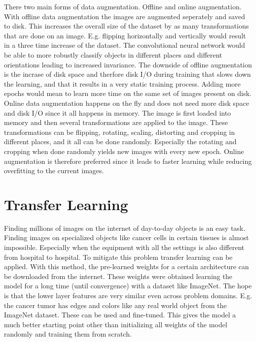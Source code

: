 There two main forms of data augmentation. Offline and online augmentation. With offline data augmentation the images are augmented seperately and saved to disk. This increases the overall size of the dataset by as many transformations that are done on an image. E.g. flipping horizontally and vertically would result in a three time increase of the dataset. The convolutional neural network would be able to more robustly classify objects in different places and different orientations leading to increased invariance. The downside of offline augmentation is the incrase of disk space and therfore disk I/O during training that slows down the learning, and that it results in a very static training process. Adding more epochs would mean to learn more time on the same set of images present on disk.
Online data augmentation happens on the fly and does not need more disk space and disk I/O since it all happens in memory. The image is first loaded into memory and then several transformations are applied to the image. These transformations can be flipping, rotating, scaling, distorting and cropping in different places, and it all can be done randomly. Especially the rotating and cropping when done randomly yields new images with every new epoch. Online augmentation is therefore preferred since it leads to faster learning while reducing overfitting to the current images.

\section{Transfer Learning}

Finding millions of images on the internet of day-to-day objects is an easy task. Finding images on specialized objects like cancer cells in certain tissues is almost impossible. Especially when the equipment with all the settings is also different from hospital to hospital. To mitigate this problem transfer learning can be applied. With this method, the pre-learned weights for a certain architecture can be downloaded from the internet. These weights were obtained learning the model for a long time (until convergence) with a dataset like ImageNet. The hope is that the lower layer features are very similar even across problem domains. E.g. the cancer tumor has edges and colors like any real world object from the ImageNet dataset. These can be used and fine-tuned. This gives the model a much better starting point other than initializing all weights of the model randomly and training them from scratch.


